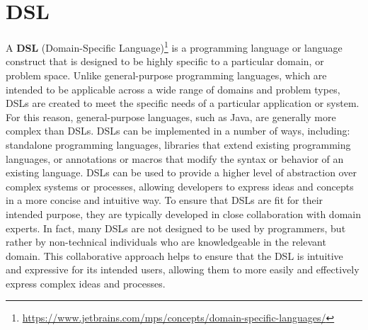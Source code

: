 \section{DSL}\label{section:dsl}
A \textbf{DSL} (Domain-Specific Language)\footnote{\url{https://www.jetbrains.com/mps/concepts/domain-specific-languages/}} is a programming language or language construct that is designed to be highly specific to a particular domain, or problem space. Unlike general-purpose programming languages, which are intended to be applicable across a wide range of domains and problem types, DSLs are created to meet the specific needs of a particular application or system. For this reason, general-purpose languages, such as Java, are generally more complex than DSLs.\newline 
DSLs can be implemented in a number of ways, including: standalone programming languages, libraries that extend existing programming languages, or annotations or macros that modify the syntax or behavior of an existing language. DSLs can be used to provide a higher level of abstraction over complex systems or processes, allowing developers to express ideas and concepts in a more concise and intuitive way.\newline
To ensure that DSLs are fit for their intended purpose, they are typically developed in close collaboration with domain experts. In fact, many DSLs are not designed to be used by programmers, but rather by non-technical individuals who are knowledgeable in the relevant domain. This collaborative approach helps to ensure that the DSL is intuitive and expressive for its intended users, allowing them to more easily and effectively express complex ideas and processes.


